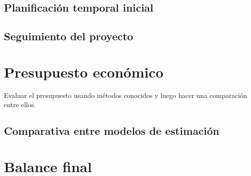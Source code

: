 \subsection{Planificación temporal inicial}
\subsection{Seguimiento del proyecto}
\section{Presupuesto económico}
Evaluar el presupuesto usando métodos conocidos y luego hacer una comparación entre ellos.
\subsection{Comparativa entre modelos de estimación}
\section{Balance final}